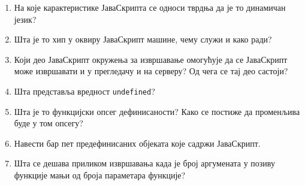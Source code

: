 \documentclass[a4paper]{article}
\begin{document}
\begin{enumerate}
\hrulefill

\hrulefill


\item На које карактеристике ЈаваСкрипта се односи тврдња да је то динамичан језик? \hrulefill

\hrulefill

\hrulefill

\hrulefill

\hrulefill


\item Шта је то хип у оквиру ЈаваСкрипт машине, чему служи и како ради? \hrulefill

\hrulefill

\hrulefill

\hrulefill

\hrulefill


\item Који део ЈаваСкрипт окружења за извршавање омогућује да се ЈаваСкрипт може извршавати и у прегледачу и на серверу? Од чега се тај део састоји? \hrulefill

\hrulefill

\hrulefill 

\hrulefill

\hrulefill


\item Шта представља вредност \verb|undefined|? \hrulefill

\hrulefill

\hrulefill 

\hrulefill 


\item Шта је то функцијски опсег дефинисаности? Како се постиже да променљива буде у том опсегу? \hrulefill

\hrulefill 

\hrulefill 

\hrulefill

\hrulefill


\item Навести бар пет предефинисаних објеката које садржи ЈаваСкрипт. \hrulefill

\hrulefill 


\item Шта се дешава приликом извршавања када је број аргумената у позиву функције мањи од броја параметара функције? \hrulefill

\hrulefill

\hrulefill

\hrulefill


\end{enumerate}
\end{document}
